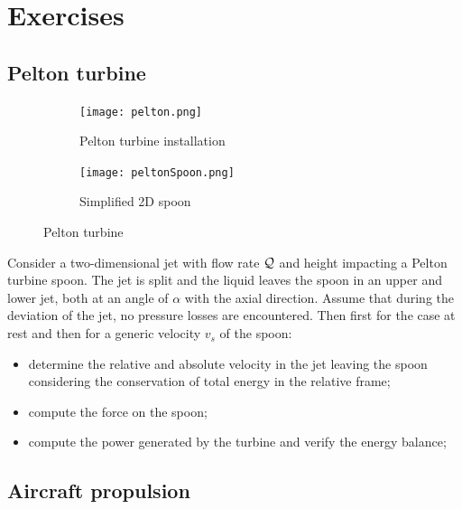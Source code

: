 
\section{Exercises}
\label{subsec:hydraulics:exercises}
  
\subsection*{Pelton turbine}
\label{subsec:hydraulics:exercises:pelton}

\begin{figure}[!h]
  \centering
  \begin{subfigure}{0.49\textwidth}
    \center
    \texttt{[image: pelton.png]}
    \caption{Pelton turbine installation}
  \end{subfigure}
  \begin{subfigure}{0.49\textwidth}
    \center
    \texttt{[image: peltonSpoon.png]}
    \caption{Simplified 2D spoon}
  \end{subfigure}
  \caption{Pelton turbine}
\end{figure}

Consider a two-dimensional jet with flow rate $\mathcal Q$ and height
impacting a Pelton turbine spoon. The jet is split and the liquid
leaves the spoon in an upper and lower jet, both at an angle of
$\alpha$ with the axial direction. Assume that during the deviation of
the jet, no pressure losses are encountered. Then first for the case
at rest and then for a generic velocity $v_s$ of the spoon:
\begin{itemize}
\item determine the relative and absolute velocity in the jet leaving
  the spoon considering the conservation of total energy in the
  relative frame;
\item compute the force on the spoon;
\item compute the power generated by the turbine and verify the energy
  balance;
\end{itemize}

\clearpage
\subsection*{Aircraft propulsion}
\label{exercise:thrush1}


